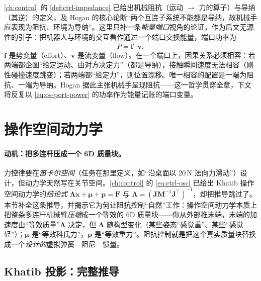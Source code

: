 \cref{ch:control} 的 \cref{def:ctrl-impedance} 已给出机械阻抗（运动 $\to$ 力的算子）与导纳（其逆）的定义，及 Hogan 的核心论断“两个互连子系统不能都是导纳，故机械手应表现为阻抗、环境为导纳”。这里只补一条\emph{能量端口}视角的论证，作为后文无源性的引子：把机器人与环境的交互看作通过一个端口交换能量，端口功率为
\begin{equation}
  P=\mathbf f^\top\mathbf v,
  \label{eq:os-port-power}
\end{equation}
$\mathbf f$ 是势变量（effort）、$\mathbf v$ 是流变量（flow）。在一个端口上，因果关系必须相容：若两端都企图“给定运动、由对方决定力”（都是导纳），接触瞬间速度无法相容（刚性碰撞速度跳变）；若两端都“给定力”，则位置漂移。唯一相容的配置是一端为阻抗、一端为导纳。Hogan 据此主张机械手呈现阻抗——这一哲学贯穿全章，下文将反复以 \cref{eq:os-port-power} 的功率作为能量记账的端口变量。

\section{操作空间动力学}
\label{sec:os-opspace-dynamics}

\paragraph{动机：把多连杆压成一个 6D 质量块。}
力控律要在\emph{笛卡尔空间}（任务在那里定义，如“沿桌面以 $20\,$N 法向力滑动”）设计，但动力学天然写在关节空间。\cref{ch:control} 的 \cref{eq:ctrl-osc} 已给出 Khatib 操作空间动力学的\emph{结论式} $\boldsymbol\Lambda\ddot{\mathbf x}+\boldsymbol\mu+\mathbf p=\mathbf F$ 与 $\boldsymbol\Lambda=(\mathbf J\mathbf M^{-1}\mathbf J^\top)^{-1}$，却把推导跳过了。本节补全这条推导，并揭示它为何让阻抗控制“自然”工作：操作空间动力学本质上把整条多连杆机械臂\emph{压缩}成一个等效的 6D 质量块——你从外部推末端，末端的加速度由“等效质量”$\boldsymbol\Lambda$ 决定，但 $\boldsymbol\Lambda$ 随构型变化（某些姿态“感觉重”、某些“感觉轻”）；$\boldsymbol\mu$ 是“等效科氏力”，$\mathbf p$ 是“等效重力”。阻抗控制就是把这个真实质量块替换成一个\emph{设计的}虚拟弹簧—阻尼—惯量。

\subsection{Khatib 投影：完整推导}
\label{sec:os-khatib-derivation}

